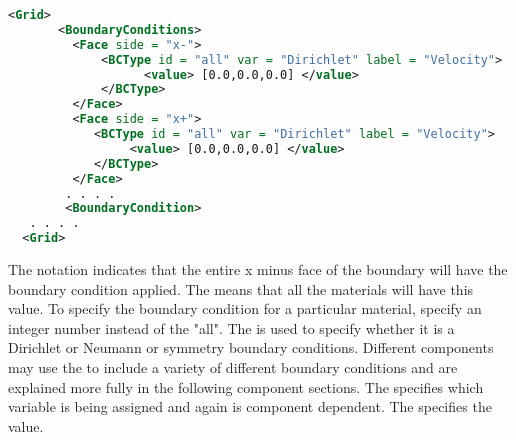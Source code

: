 \begin{lstlisting}[language=XML]
 <Grid>
       <BoundaryConditions>
         <Face side = "x-">
             <BCType id = "all" var = "Dirichlet" label = "Velocity">
                   <value> [0.0,0.0,0.0] </value>
             </BCType>
         </Face>
         <Face side = "x+">
            <BCType id = "all" var = "Dirichlet" label = "Velocity">
                 <value> [0.0,0.0,0.0] </value>
            </BCType>
         </Face>
        . . . .
        <BoundaryCondition>
   . . . .
  <Grid>
\end{lstlisting}

The notation  indicates that the
entire x minus face of the boundary will have the boundary condition
applied.  The  means that all the
materials will have this value.  To specify the boundary condition for
a particular material, specify an integer number instead of the
"all".  The  is used to specify
whether it is a Dirichlet or Neumann or symmetry boundary conditions.
Different components may use the  to include a
variety of different boundary conditions and are explained more fully
in the following component sections.  The 
specifies which variable is being assigned and again is
component dependent.  The 
specifies the value.

